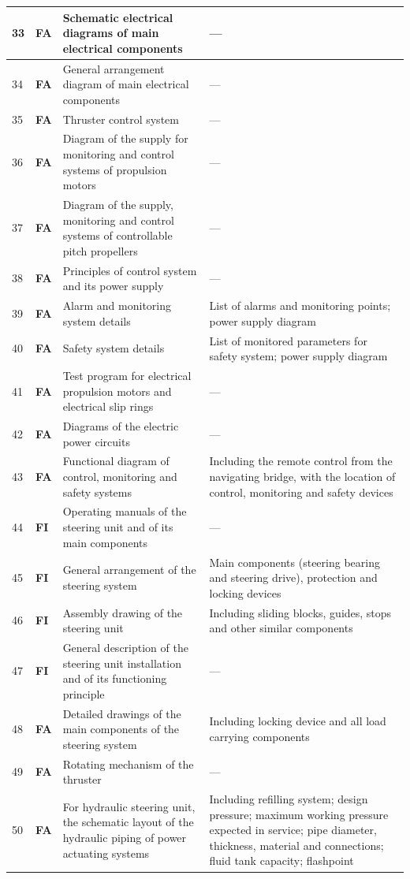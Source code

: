 \documentclass[11pt,a4paper]{report}
\newcommand{\fa}{\textbf{\textcolor{warningred}{FA}}}
\newcommand{\fic}{\textbf{\textcolor{bvgray}{FI}}}
\begin{document}
\begin{longtable}{|p{0.7cm}|p{1.1cm}|p{6.0cm}|p{6.2cm}|}
\hline
33 & \fa{} & Schematic electrical diagrams of main electrical components & --- \\
\hline
34 & \fa{} & General arrangement diagram of main electrical components & --- \\
\hline
35 & \fa{} & Thruster control system & --- \\
\hline
36 & \fa{} & Diagram of the supply for monitoring and control systems of propulsion motors & --- \\
\hline
37 & \fa{} & Diagram of the supply, monitoring and control systems of controllable pitch propellers & --- \\
\hline
38 & \fa{} & Principles of control system and its power supply & --- \\
\hline
39 & \fa{} & Alarm and monitoring system details & List of alarms and monitoring points; power supply diagram \\
\hline
40 & \fa{} & Safety system details & List of monitored parameters for safety system; power supply diagram \\
\hline
41 & \fa{} & Test program for electrical propulsion motors and electrical slip rings & --- \\
\hline
42 & \fa{} & Diagrams of the electric power circuits & --- \\
\hline
43 & \fa{} & Functional diagram of control, monitoring and safety systems & Including the remote control from the navigating bridge, with the location of control, monitoring and safety devices \\
\hline
44 & \fic{} & Operating manuals of the steering unit and of its main components & --- \\
\hline
45 & \fic{} & General arrangement of the steering system & Main components (steering bearing and steering drive), protection and locking devices \\
\hline
46 & \fic{} & Assembly drawing of the steering unit & Including sliding blocks, guides, stops and other similar components \\
\hline
47 & \fic{} & General description of the steering unit installation and of its functioning principle & --- \\
\hline
48 & \fa{} & Detailed drawings of the main components of the steering system & Including locking device and all load carrying components \\
\hline
49 & \fa{} & Rotating mechanism of the thruster & --- \\
\hline
50 & \fa{} & For hydraulic steering unit, the schematic layout of the hydraulic piping of power actuating systems & Including refilling system; design pressure; maximum working pressure expected in service; pipe diameter, thickness, material and connections; fluid tank capacity; flashpoint \\

\end{longtable}
\end{document}
